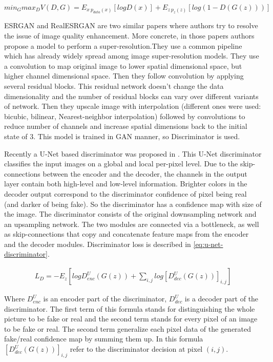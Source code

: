 \begin{equation}
    \label{eq:gan}
    min_G max_D V(D, G) = E_{x~p_{data}(x)} [log D(x)] + E_{z~p_z(z)} [log(1 - D(G(z)))]
\end{equation}

ESRGAN \cite{Wang_Yu_Wu_Gu_Liu_Dong_Qiao_Loy_2019} and RealESRGAN \cite{Wang_Xie_Dong_Shan_2021} are two similar papers where authors try to resolve the issue of image quality enhancement. More concrete, in those papers authors propose a model to perform a super-resolution.They use a common pipeline which has already widely spread among image super-resolution models. They use a convolution to map original image to lower spatial dimensional space, but higher channel dimensional space. Then they follow convolution by applying several residual blocks. This residual network doesn't change the data dimensionality and the number of residual blocks can vary over different variants of network. Then they upscale image with interpolation (different ones were used: bicubic, bilinear, Nearest-neighbor interpolation) followed by convolutions to reduce number of channels and increase spatial dimensions back to the initial state of 3. This model is trained in GAN manner, so Discriminator is used.

Recently a U-Net based discriminator was proposed in \cite{schonfeld_u-net_2021}. This U-Net discriminator classifies the input images on a global and local per-pixel level. Due to the skip-connections between the encoder and the decoder, the channels in the output layer contain both high-level and low-level information. Brighter colors in the decoder output correspond to the discriminator confidence of pixel being real (and darker of being fake). So the discriminator has a confidence map with size of the image. The discriminator consists of the original downsampling network and an upsampling network. The two modules are connected via a bottleneck, as well as skip-connections that copy and concatenate feature maps from the encoder and the decoder modules. Discriminator loss is described in \ref{eq:u-net-discriminator}.

\begin{equation}
    \label{eq:u-net-discriminator}
    \begin{split}
        L_D = -E_z[log D_{enc}^U(G(z)) + \sum_{i,j}{log [D_{dec}^U(G(z))]_{i,j}}]
    \end{split}
\end{equation}

Where $D_{enc}^U$ is an encoder part of the discriminator, $D_{dec}^U$ is a decoder part of the discriminator. The first term of this formula stands for distinguishing the whole picture to be fake or real and the second term stands for every pixel of an image to be fake or real. The second term generalize each pixel data of the generated fake/real confidence map by summing them up. In this formula $[D_{dec}^U(G(z))]_{i,j}$ refer to the discriminator decision at pixel $(i,j)$.

